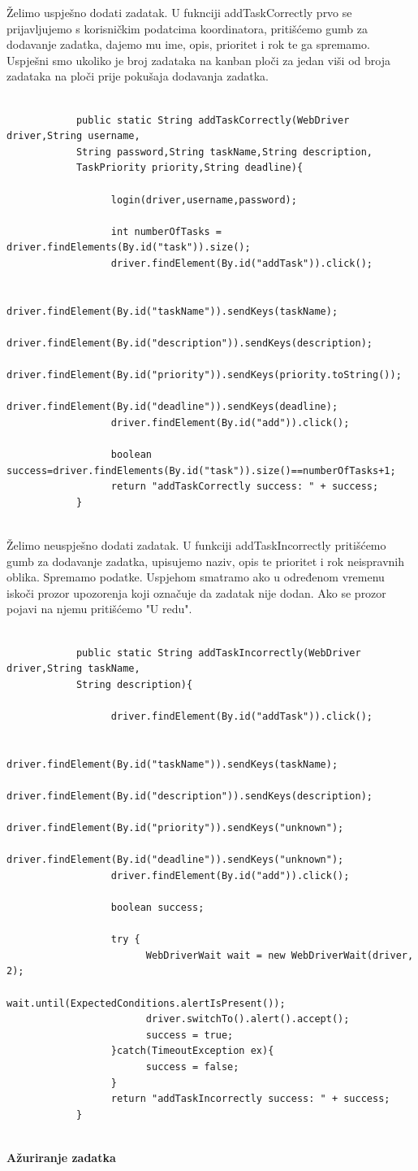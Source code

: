 		Želimo uspješno dodati zadatak. U fuknciji addTaskCorrectly prvo se prijavljujemo s korisničkim podatcima koordinatora, pritišćemo gumb za dodavanje zadatka, dajemo mu ime, opis, prioritet i rok te ga spremamo. Uspješni smo ukoliko je broj zadataka na kanban ploči za jedan viši od broja zadataka na ploči prije pokušaja dodavanja zadatka.
		\begin{verbatim}
			
			public static String addTaskCorrectly(WebDriver driver,String username, 
			String password,String taskName,String description,
			TaskPriority priority,String deadline){
				
				  login(driver,username,password);
				
				  int numberOfTasks = driver.findElements(By.id("task")).size();
				  driver.findElement(By.id("addTask")).click();
				
				  driver.findElement(By.id("taskName")).sendKeys(taskName);
				  driver.findElement(By.id("description")).sendKeys(description);
				  driver.findElement(By.id("priority")).sendKeys(priority.toString());
				  driver.findElement(By.id("deadline")).sendKeys(deadline);
				  driver.findElement(By.id("add")).click();
				
				  boolean success=driver.findElements(By.id("task")).size()==numberOfTasks+1;
				  return "addTaskCorrectly success: " + success;
			}
			
		\end{verbatim}
		Želimo neuspješno dodati zadatak. U funkciji addTaskIncorrectly pritišćemo gumb za dodavanje zadatka, upisujemo naziv, opis te prioritet i rok neispravnih oblika. Spremamo podatke. Uspjehom smatramo ako u određenom vremenu iskoči prozor upozorenja koji označuje da zadatak nije dodan. Ako se prozor pojavi na njemu pritišćemo "U redu".
		
		\begin{verbatim}
			
			public static String addTaskIncorrectly(WebDriver driver,String taskName,
			String description){
				
				  driver.findElement(By.id("addTask")).click();
				
				  driver.findElement(By.id("taskName")).sendKeys(taskName);
				  driver.findElement(By.id("description")).sendKeys(description);
				  driver.findElement(By.id("priority")).sendKeys("unknown");
				  driver.findElement(By.id("deadline")).sendKeys("unknown");
				  driver.findElement(By.id("add")).click();
				
				  boolean success;
				
				  try {
					    WebDriverWait wait = new WebDriverWait(driver, 2);
					    wait.until(ExpectedConditions.alertIsPresent());
					    driver.switchTo().alert().accept();
					    success = true;
				  }catch(TimeoutException ex){
					    success = false;
				  }
				  return "addTaskIncorrectly success: " + success;
			}
			
		\end{verbatim}
		\textbf{Ažuriranje zadatka}
		
